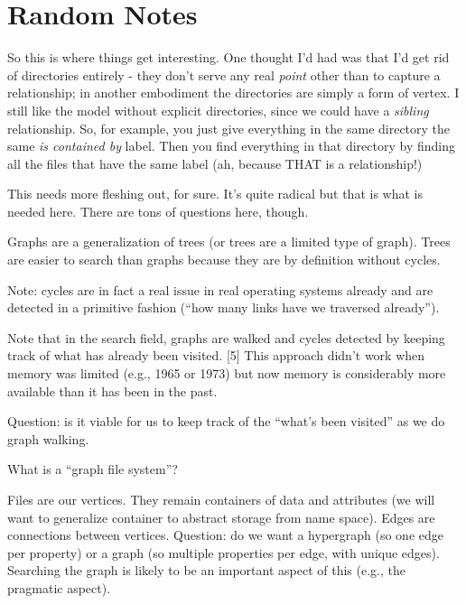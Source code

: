 \section{Random Notes}

So this is where things get interesting.  One thought I'd had was that I'd get rid of directories entirely - they don't serve any real \textit{point}
other than to capture a relationship; in another embodiment the directories are simply a form of vertex.  I still like the model without explicit
directories, since we could have a \textit{sibling} relationship.  So, for example, you just give everything in the same directory the same
\textit{is contained by} label.  Then you find everything in that directory by finding all the files that have the same label (ah, because THAT is a
relationship!)

This needs more fleshing out, for sure.  It's quite radical but that is what is needed here.  There are tons of questions here, though.



Graphs are a generalization of trees (or trees are a limited type of graph).  Trees are easier to search than graphs because they are by definition without cycles.

Note: cycles are in fact a real issue in real operating systems already and are detected in a primitive fashion (“how many links have we traversed already”). 

Note that in the search field, graphs are walked and cycles detected by keeping track of what has already been visited.  [5] This approach didn’t work when memory was limited (e.g., 1965 or 1973) but now memory is considerably more available than it has been in the past.

Question: is it viable for us to keep track of the “what’s been visited” as we do graph walking.

What is a “graph file system”?

Files are our vertices.  They remain containers of data and attributes (we will want to generalize container to abstract storage from name space).
Edges are connections between vertices.  Question: do we want a hypergraph (so one edge per property) or a graph (so multiple properties per edge, with unique edges).  Searching the graph is likely to be an important aspect of this (e.g., the pragmatic aspect).
